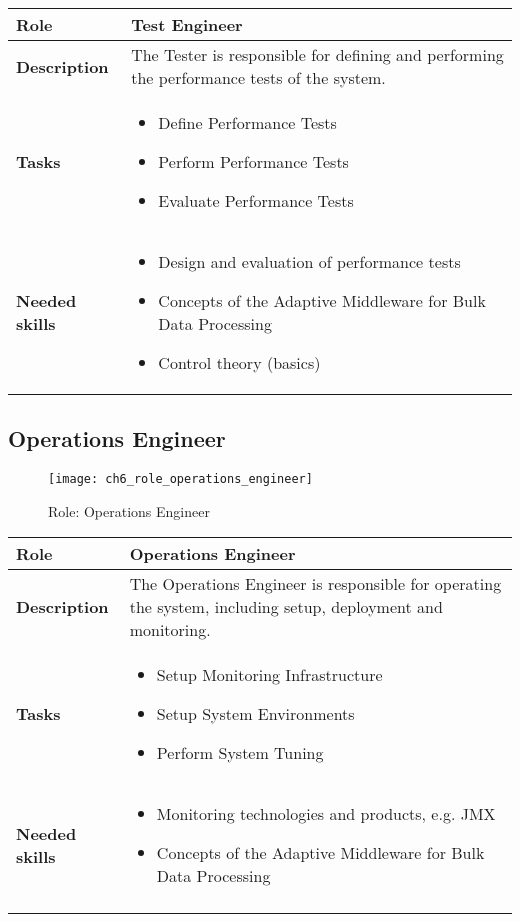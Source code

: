 \begin{tabularx}{\textwidth}{@{} l X @{}}
	\caption{Test Engineer} \label{table:ch6_Role_Test_Engineer}\\
	\toprule
	\bfseries Role & Test Engineer\\
	\midrule
	\bfseries Description & The Tester is responsible for defining and performing the performance tests of the system.\\
	\midrule
	\bfseries Tasks & 
	\begin{itemize}
		\item Define Performance Tests
		\item Perform Performance Tests
		\item Evaluate Performance Tests
	\end{itemize}
	\\
	\midrule
	\bfseries Needed skills &
	\begin{itemize}
		\item Design and evaluation of performance tests
		\item Concepts of the Adaptive Middleware for Bulk Data Processing
		\item Control theory (basics)
	\end{itemize}
	\\
	\bottomrule
\end{tabularx}


\subsection{Operations Engineer}
\begin{figure}[htpb] \centering 
	\texttt{[image: ch6\_role\_operations\_engineer]} 
	\caption{Role: Operations Engineer} 
	\label{fig:ch6_role_operations_engineer} 
\end{figure}

\begin{tabularx}{\textwidth}{@{} l X @{}}
	\caption{Operations Engineer}\label{table:ch6_Role_Operations_Engineer}\\
	\toprule
	\bfseries Role & Operations Engineer\\
	\midrule
	\bfseries Description & The Operations Engineer is responsible for operating the system, including setup, deployment and monitoring.\\
	\midrule
	\bfseries Tasks & 
	\begin{itemize}
		\item Setup Monitoring Infrastructure
		\item Setup System Environments
		\item Perform System Tuning
	\end{itemize}
	\\
	\midrule
	\bfseries Needed skills &
	\begin{itemize}
		\item Monitoring technologies and products, e.g. \ac{JMX}
		\item Concepts of the Adaptive Middleware for Bulk Data Processing
	\end{itemize}
	\\
	\endline
\end{tabularx}

